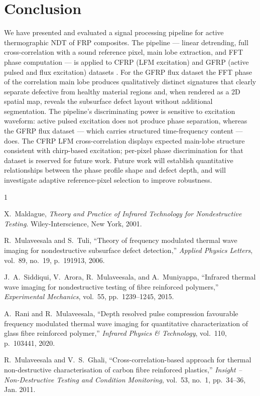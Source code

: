 \documentclass[conference]{IEEEtran}
\begin{document}
  \section{Conclusion}

  We have presented and evaluated a signal processing pipeline for active
  thermographic NDT of FRP composites. The pipeline --- linear detrending,
  full cross-correlation with a sound reference pixel, main lobe extraction,
  and FFT phase computation --- is applied to CFRP (LFM excitation) and GFRP
  (active pulsed and flux excitation) datasets \cite{siddiqui2015}. For the
  GFRP flux dataset the FFT phase of the correlation main lobe produces
  qualitatively distinct signatures that clearly separate defective from
  healthy material regions and, when rendered as a 2D spatial map, reveals
  the subsurface defect layout without additional segmentation. The pipeline's
  discriminating power is sensitive to excitation waveform: active pulsed
  excitation does not produce phase separation, whereas the GFRP flux dataset
  --- which carries structured time-frequency content --- does. The CFRP LFM
  cross-correlation displays expected main-lobe structure consistent with
  chirp-based excitation; per-pixel phase discrimination for that dataset is
  reserved for future work. Future work will establish quantitative relationships
  between the phase profile shape and defect depth, and will investigate
  adaptive reference-pixel selection to improve robustness.

  \begin{thebibliography}{1}

  X.~Maldague,
  \textit{Theory and Practice of Infrared Technology for Nondestructive Testing}.
  Wiley-Interscience, New York, 2001.

  R.~Mulaveesala and S.~Tuli,
  ``Theory of frequency modulated thermal wave imaging for nondestructive
  subsurface defect detection,''
  \textit{Applied Physics Letters}, vol.~89, no.~19, p.~191913, 2006.

  J.~A.~Siddiqui, V.~Arora, R.~Mulaveesala, and A.~Muniyappa,
  ``Infrared thermal wave imaging for nondestructive testing of
  fibre reinforced polymers,''
  \textit{Experimental Mechanics},
  vol.~55, pp.~1239--1245, 2015.

  A.~Rani and R.~Mulaveesala,
  ``Depth resolved pulse compression favourable frequency modulated
  thermal wave imaging for quantitative characterization of glass
  fibre reinforced polymer,''
  \textit{Infrared Physics \& Technology},
  vol.~110, p.~103441, 2020.

  R.~Mulaveesala and V.~S.~Ghali,
  ``Cross-correlation-based approach for thermal non-destructive
  characterisation of carbon fibre reinforced plastics,''
  \textit{Insight -- Non-Destructive Testing and Condition Monitoring},
  vol.~53, no.~1, pp.~34--36, Jan. 2011.

  \end{thebibliography}

  
\end{document}
